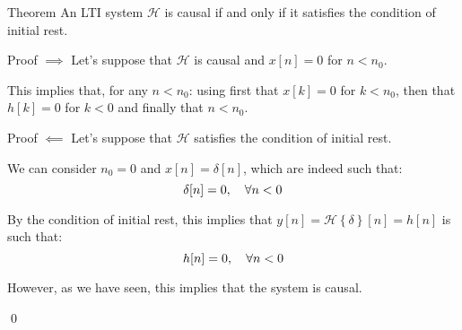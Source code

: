 \documentclass[a4paper]{article}
\begin{document}
\begin{parag}{Theorem}
    An LTI system $\mathcal{H}$ is causal if and only if it satisfies the condition of initial rest.

    \begin{subparag}{Proof $\implies$}
        Let's suppose that $\mathcal{H}$ is causal and $x\left[n\right] = 0$ for $n < n_0$.

        This implies that, for any $n < n_0$:
        using first that $x\left[k\right] = 0$ for $k < n_0$, then that $h\left[k\right] = 0$ for $k < 0$ and finally that $n < n_0$.
        
    \end{subparag}

    \begin{subparag}{Proof $\impliedby$}
        Let's suppose that $\mathcal{H}$ satisfies the condition of initial rest.

        We can consider $n_0 = 0$ and $x\left[n\right] = \delta \left[n\right]$, which are indeed such that: 
        \[\delta \left[n\right] = 0, \mathspace \forall n < 0\]
        
        By the condition of initial rest, this implies that $y\left[n\right] = \mathcal{H}\left\{\delta\right\}\left[n\right] = h\left[n\right]$ is such that:
        \[h\left[n\right] = 0, \mathspace \forall n < 0\]

        However, as we have seen, this implies that the system is causal.

        \qed
    \end{subparag}
\end{parag}
\end{document}
